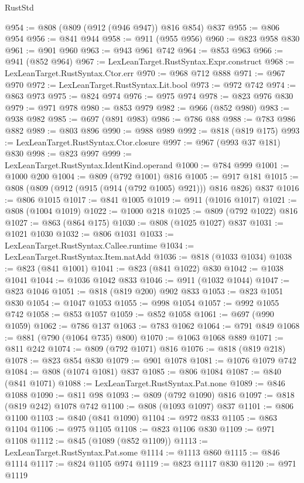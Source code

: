\begin{lexlean}{RustStd}
\begin{coremodule}
@954 := @808 (@809 (@912 (@946 @947)) @816 @854) @837
@955 := @806 @954
@956 := @841 @944
@958 := @911 (@955 @956)
@960 := @823 @958 @830
@961 := @901 @960
@963 := @943 @961 @742
@964 := @853 @963
@966 := @941 (@852 @964)
@967 := LexLeanTarget.RustSyntax.Expr.construct
@968 := LexLeanTarget.RustSyntax.Ctor.err
@970 := @968 @712 @888
@971 := @967 @970
@972 := LexLeanTarget.RustSyntax.Lit.bool
@973 := @972 @742
@974 := @863 @973
@975 := @824 @974
@976 := @975 @974
@978 := @823 @976 @830
@979 := @971 @978
@980 := @853 @979
@982 := @966 (@852 @980)
@983 := @938 @982
@985 := @697 (@891 @983)
@986 := @786 @88
@988 := @783 @986 @882
@989 := @803 @896
@990 := @988 @989
@992 := @818 (@819 @175)
@993 := LexLeanTarget.RustSyntax.Ctor.closure
@997 := @967 (@993 @37 @181) @830
@998 := @823 @997
@999 := LexLeanTarget.RustSyntax.IdentKind.operand
@1000 := @784 @999
@1001 := @1000 @200
@1004 := @809 (@792 @1001) @816
@1005 := @917 @181
@1015 := @808 (@809 (@912 (@915 (@914 (@792 @1005) @921))) @816 @826) @837
@1016 := @806 @1015
@1017 := @841 @1005
@1019 := @911 (@1016 @1017)
@1021 := @808 (@1004 @1019)
@1022 := @1000 @218
@1025 := @809 (@792 @1022) @816
@1027 := @863 (@864 @175)
@1030 := @808 (@1025 @1027) @837
@1031 := @1021 @1030
@1032 := @806 @1031
@1033 := LexLeanTarget.RustSyntax.Callee.runtime
@1034 := LexLeanTarget.RustSyntax.Item.natAdd
@1036 := @818 (@1033 @1034)
@1038 := @823 (@841 @1001)
@1041 := @823 (@841 @1022) @830
@1042 := @1038 @1041
@1044 := @1036 @1042 @833
@1046 := @911 (@1032 @1044)
@1047 := @823 @1046
@1051 := @818 (@819 @200) @902 @833
@1053 := @823 @1051 @830
@1054 := @1047 @1053
@1055 := @998 @1054
@1057 := @992 @1055 @742
@1058 := @853 @1057
@1059 := @852 @1058
@1061 := @697 (@990 @1059)
@1062 := @786 @137
@1063 := @783 @1062
@1064 := @791 @849
@1068 := @881 (@790 (@1064 @735) @800)
@1070 := @1063 @1068 @889
@1071 := @811 @242
@1074 := @809 (@792 @1071) @816
@1076 := @818 (@819 @218)
@1078 := @823 @854 @830
@1079 := @901 @1078
@1081 := @1076 @1079 @742
@1084 := @808 (@1074 @1081) @837
@1085 := @806 @1084
@1087 := @840 (@841 @1071)
@1088 := LexLeanTarget.RustSyntax.Pat.none
@1089 := @846 @1088
@1090 := @811 @98
@1093 := @809 (@792 @1090) @816
@1097 := @818 (@819 @242) @1078 @742
@1100 := @808 (@1093 @1097) @837
@1101 := @806 @1100
@1103 := @840 (@841 @1090)
@1104 := @972 @833
@1105 := @863 @1104
@1106 := @975 @1105
@1108 := @823 @1106 @830
@1109 := @971 @1108
@1112 := @845 (@1089 (@852 @1109))
@1113 := LexLeanTarget.RustSyntax.Pat.some
@1114 := @1113 @860
@1115 := @846 @1114
@1117 := @824 @1105 @974
@1119 := @823 @1117 @830
@1120 := @971 @1119

\end{coremodule}
\end{lexlean}
